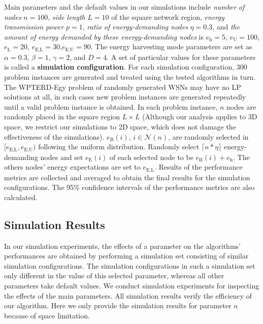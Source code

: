\documentclass[12pt,journal,onecolumn,draftcls]{IEEEtran}
\begin{document}
Main parameters and the default values in our simulations include \textit{number of nodes} $n{=}100$, \textit{side length} $L{=}10$ of the square network region, \textit{energy transmission power} $p{=}1$, \textit{ratio of energy-demanding nodes} $\eta{=}0.3$, and \textit{the amount of energy demanded by these energy-demanding nodes} is $e_\text{h}{=}5$, $e_\text{U}{=}100$, $e_\text{L}{=}20$, $e_\text{E,L}{=}30$,$e_\text{E,U}{=}90$. The energy harvesting mode parameters are set as $\alpha{=}0.3$, $\beta{=}1$, $\gamma{=}2$, and $D{=}4$. A set of particular values for these parameters is called a \textbf{simulation configuration}. For each simulation configuration, 300 problem instances are generated and treated using the tested algorithms in turn. The WPTERD-Egy problem of randomly generated WSNs may have no LP solutions at all, in such cases new problem instances are generated repeatedly until a valid problem instance is obtained. In each problem instance, $n$ nodes are randomly placed in the square region $L{\times}L$ (Although our analysis applies to 3D space, we restrict our simulations to 2D space, which does not damage the effectiveness of the simulations). $e_\text{B}(i)$, $i{\in}\mathcal{N}(n)$, are randomly selected in $[e_\text{E,L},e_\text{E,U})$ following the uniform distribution. Randomly select ${\lceil}n{*}\eta{\rceil}$ energy-demanding nodes and set $e_\text{E}(i)$ of each selected node to be $e_\text{B}(i){+}e_\text{h}$. The others nodes' energy expectations are set to $e_\text{E,L}$. Results of the performance metrics are collected and averaged to obtain the final results for the simulation configurations. The 95\% confidence intervals of the performance metrics are also calculated.

\subsection{Simulation Results}

In our simulation experiments, the effects of a parameter on the algorithms' performances are obtained by performing a simulation set consisting of similar simulation configurations. The simulation configurations in such a simulation set only different in the value of this selected parameter, whereas all other parameters take default values. We conduct simulation experiments for inspecting the effects of the main parameters. All simulation results verify the efficiency of our algorithm. Here we only provide the simulation results for parameter $n$ because of space limitation.
\end{document}
